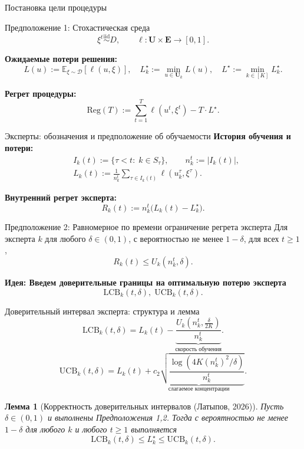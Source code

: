 \documentclass[aspectratio=169]{beamer}
\newtheorem{ru_lemma}{Лемма}
\begin{document}
\begin{frame}{Постановка цели процедуры}
\small

\begin{block}{Предположение 1: Стохастическая среда}
\[
\xi^t\overset{\mathrm{iid}}{\sim}D,\qquad \ell:\mathbf{U}\times\mathbf{E}\to[0,1].
\]
\end{block}

\textbf{Ожидаемые потери решения:}
\[
L(u):=\mathbb{E}_{\xi\sim\mathcal{D}}[\ell(u,\xi)],\quad
L_k^\star:=\min_{u\in\mathbf{U}_k}L(u),\quad
L^\star:=\min_{k\in[K]}L_k^\star.
\]

\textbf{Регрет процедуры:}
\[
\mathrm{Reg}(T):=\sum_{t=1}^T\ell(u^t,\xi^t)-T\cdot L^\star.
\]

\end{frame}

\begin{frame}{Эксперты: обозначения и предположение об обучаемости}
\small
\textbf{История обучения и потери:}
\begin{align}
&I_k(t):=\{\tau<t:\;k\in S_\tau\},\qquad n_k^t:=|I_k(t)|, \\
&L_k(t):=\frac{1}{n_k^t}\sum_{\tau\in I_k(t)}\ell(u_k^\tau,\xi^\tau).
\end{align}

\textbf{Внутренний регрет эксперта:}
\[
R_k(t):=n_k^t\big(L_k(t)-L_k^\star\big).
\]

\begin{block}{Предположение 2: Равномерное по времени ограничение регрета эксперта}
Для эксперта $k$ для любого $\delta\in(0,1)$, с вероятностью не менее $1-\delta$, для всех $t\ge1$,
\[
R_k(t)\le U_k(n_k^t,\delta).
\]
\end{block}

\textbf{Идея: Введем доверительные границы на оптимальную потерю эксперта}
\[
\mathrm{LCB}_k(t,\delta),\;\mathrm{UCB}_k(t,\delta).
\]
\end{frame}

\begin{frame}{Доверительный интервал эксперта: структура и лемма}
\small
\[
\mathrm{LCB}_k(t,\delta)=L_k(t)-\underbrace{\frac{U_k(n_k^t,\frac{\delta}{2K})}{n_k^t}}_{\text{скорость обучения}}.
\]
\[
\mathrm{UCB}_k(t,\delta)=L_k(t)+\underbrace{c_2\sqrt{\frac{\log(4K(n_k^t)^2/\delta)}{n_k^t}}}_{\text{слагаемое концентрации}}.
\]

\begin{ru_lemma}[Корректность доверительных интервалов (Латыпов, 2026)]
Пусть $\delta \in (0,1)$ и выполнены Предположения 1,2. Тогда с вероятностью не менее $1-\delta$ для любого $k$ и любого $t\ge1$ выполняется
\[
\mathrm{LCB}_k(t,\delta)\le L_k^\star\le\mathrm{UCB}_k(t,\delta).
\]
\end{ru_lemma}
\end{frame}
\end{document}
